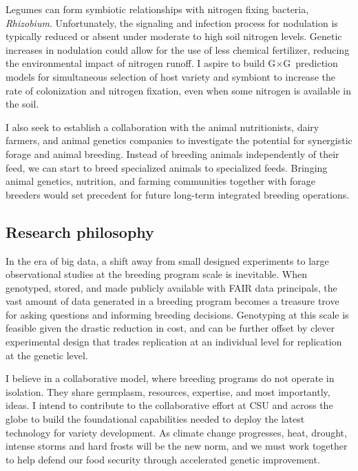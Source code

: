 \documentclass[11pt]{article}
\newcommand{\gxg}{G$\times$G}
\begin{document}
Legumes can form symbiotic relationships with nitrogen fixing bacteria, \emph{Rhizobium}. Unfortunately, the signaling and infection process for nodulation is typically reduced or absent under moderate to high soil nitrogen levels. Genetic increases in nodulation could allow for the use of less chemical fertilizer, reducing the environmental impact of nitrogen runoff. I aspire to build \gxg\ prediction models for simultaneous selection of host variety and symbiont to increase the rate of colonization and nitrogen fixation, even when some nitrogen is available in the soil.

I also seek to establish a collaboration with the animal nutritionists, dairy farmers, and animal genetics companies to investigate the potential for synergistic forage and animal breeding. Instead of breeding animals independently of their feed, we can start to breed specialized animals to specialized feeds. Bringing animal genetics, nutrition, and farming communities together with forage breeders would set precedent for future long-term integrated breeding operations.

\subsection*{Research philosophy}

In the era of big data, a shift away from small designed experiments to large observational studies at the breeding program scale is inevitable. When genotyped, stored, and made publicly available with FAIR data principals, the vast amount of data generated in a breeding program becomes a treasure trove for asking questions and informing breeding decisions. Genotyping at this scale is feasible given the drastic reduction in cost, and can be further offset by clever experimental design that trades replication at an individual level for replication at the genetic level.

I believe in a collaborative model, where breeding programs do not operate in isolation. They share germplasm, resources, expertise, and most importantly, ideas. I intend to contribute to the collaborative effort at CSU and across the globe to build the foundational capabilities needed to deploy the latest technology for variety development. As climate change progresses, heat, drought, intense storms and hard frosts will be the new norm, and we must work together to help defend our food security through accelerated genetic improvement. 
\end{document}
